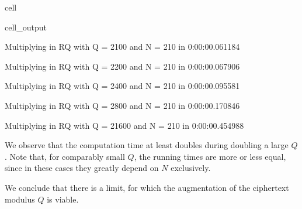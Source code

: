 \documentclass[letterpaper,10pt,english]{jupyterBook}
\begin{document}
\begin{sphinxuseclass}{cell}
\begin{sphinxVerbatimOutput}
\begin{sphinxuseclass}{cell_output}
\begin{sphinxVerbatim}[commandchars=\\\{\}]
Multiplying in R\PYGZus{}Q with Q = 2\PYGZca{}100 and N = 2\PYGZca{}10 in 0:00:00.061184
\end{sphinxVerbatim}

\begin{sphinxVerbatim}[commandchars=\\\{\}]
Multiplying in R\PYGZus{}Q with Q = 2\PYGZca{}200 and N = 2\PYGZca{}10 in 0:00:00.067906
\end{sphinxVerbatim}

\begin{sphinxVerbatim}[commandchars=\\\{\}]
Multiplying in R\PYGZus{}Q with Q = 2\PYGZca{}400 and N = 2\PYGZca{}10 in 0:00:00.095581
\end{sphinxVerbatim}

\begin{sphinxVerbatim}[commandchars=\\\{\}]
Multiplying in R\PYGZus{}Q with Q = 2\PYGZca{}800 and N = 2\PYGZca{}10 in 0:00:00.170846
\end{sphinxVerbatim}

\begin{sphinxVerbatim}[commandchars=\\\{\}]
Multiplying in R\PYGZus{}Q with Q = 2\PYGZca{}1600 and N = 2\PYGZca{}10 in 0:00:00.454988
\end{sphinxVerbatim}

\end{sphinxuseclass}\end{sphinxVerbatimOutput}

\end{sphinxuseclass}
\sphinxAtStartPar
We observe that the computation time at least doubles during doubling a large \(Q\).
Note that, for comparably small \(Q\), the running times are more or less equal, since in these cases they greatly depend on \(N\) exclusively.

\sphinxAtStartPar
We conclude that there is a limit, for which the augmentation of the ciphertext modulus \(Q\) is viable.

\begin{DUlineblock}{0em}
\item[] 
\end{DUlineblock}
\end{document}
